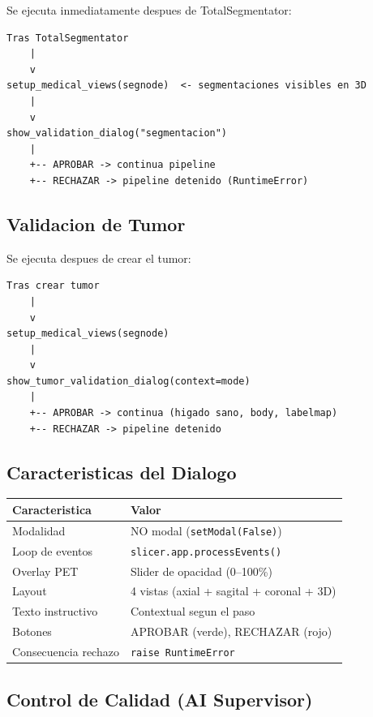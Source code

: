 \documentclass[12pt,a4paper]{article}
\begin{document}
Se ejecuta inmediatamente despues de TotalSegmentator:

\begin{verbatim}
Tras TotalSegmentator
    |
    v
setup_medical_views(segnode)  <- segmentaciones visibles en 3D
    |
    v
show_validation_dialog("segmentacion")
    |
    +-- APROBAR -> continua pipeline
    +-- RECHAZAR -> pipeline detenido (RuntimeError)
\end{verbatim}

\subsection{Validacion de Tumor}
\label{sec:validacion_tumor}

Se ejecuta despues de crear el tumor:

\begin{verbatim}
Tras crear tumor
    |
    v
setup_medical_views(segnode)
    |
    v
show_tumor_validation_dialog(context=mode)
    |
    +-- APROBAR -> continua (higado sano, body, labelmap)
    +-- RECHAZAR -> pipeline detenido
\end{verbatim}

\subsection{Caracteristicas del Dialogo}

\begin{table}[H]
\centering
\begin{tabular}{l l}
\toprule
\textbf{Caracteristica} & \textbf{Valor} \\
\midrule
Modalidad & NO modal (\texttt{setModal(False)}) \\
Loop de eventos & \texttt{slicer.app.processEvents()} \\
Overlay PET & Slider de opacidad (0--100\%) \\
Layout & 4 vistas (axial + sagital + coronal + 3D) \\
Texto instructivo & Contextual segun el paso \\
Botones & APROBAR (verde), RECHAZAR (rojo) \\
Consecuencia rechazo & \texttt{raise RuntimeError} \\
\bottomrule
\end{tabular}
\end{table}

\subsection{Control de Calidad (AI Supervisor)}
\end{document}
